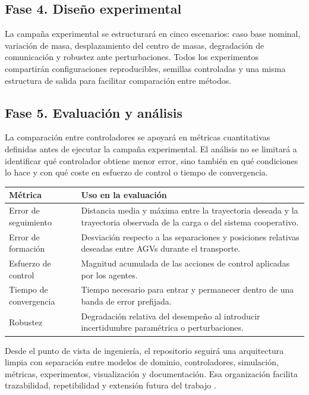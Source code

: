 \subsection{Fase 4. Diseño experimental}

La campaña experimental se estructurará en cinco escenarios: caso base nominal, variación de masa, desplazamiento del centro de masas, degradación de comunicación y robustez ante perturbaciones. Todos los experimentos compartirán configuraciones reproducibles, semillas controladas y una misma estructura de salida para facilitar comparación entre métodos.

\subsection{Fase 5. Evaluación y análisis}

La comparación entre controladores se apoyará en métricas cuantitativas definidas antes de ejecutar la campaña experimental. El análisis no se limitará a identificar qué controlador obtiene menor error, sino también en qué condiciones lo hace y con qué coste en esfuerzo de control o tiempo de convergencia.

\begin{center}
\small
\begin{tabular}{p{4.1cm}p{8.6cm}}
\toprule
\textbf{Métrica} & \textbf{Uso en la evaluación} \\
\midrule
Error de seguimiento & Distancia media y máxima entre la trayectoria deseada y la trayectoria observada de la carga o del sistema cooperativo. \\
Error de formación & Desviación respecto a las separaciones y posiciones relativas deseadas entre AGVs durante el transporte. \\
Esfuerzo de control & Magnitud acumulada de las acciones de control aplicadas por los agentes. \\
Tiempo de convergencia & Tiempo necesario para entrar y permanecer dentro de una banda de error prefijada. \\
Robustez & Degradación relativa del desempeño al introducir incertidumbre paramétrica o perturbaciones. \\
\bottomrule
\end{tabular}
\end{center}

Desde el punto de vista de ingeniería, el repositorio seguirá una arquitectura limpia con separación entre modelos de dominio, controladores, simulación, métricas, experimentos, visualización y documentación. Esa organización facilita trazabilidad, repetibilidad y extensión futura del trabajo \citep{an2023cooperative,ebel2024cooperative}.

